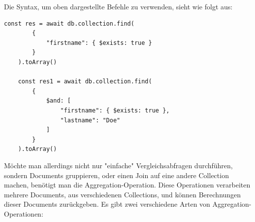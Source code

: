 \cite{mongodb_query_operations}
\newline
Die Syntax, um oben dargestellte Befehle zu verwenden, sieht wie folgt aus:
\begin{lstlisting}[caption=Verwendung Operatoren in MongoDB]
    const res = await db.collection.find(
        {
            "firstname": { $exists: true }
        }
    ).toArray()

    const res1 = await db.collection.find(
        {
            $and: [
                "firstname": { $exists: true },
                "lastname": "Doe"
            ]
        }
    ).toArray()
\end{lstlisting}
\cite{mongodb_query_basics}
\newline
Möchte man allerdings nicht nur "einfache" Vergleichsabfragen durchführen, sondern Documents gruppieren, oder einen Join auf eine andere Collection machen, benötigt man die Aggregation-Operation. Diese Operationen verarbeiten mehrere Documents, aus verschiedenen Collections, und können Berechnungen dieser Documents zurückgeben. Es gibt zwei verschiedene Arten von Aggregation-Operationen:

